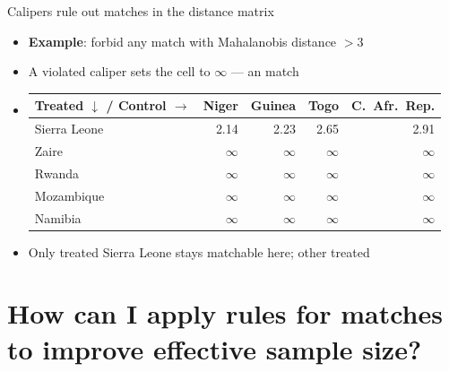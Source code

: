 \documentclass[table, xcolor = {dvipsnames}, 9pt]{beamer}
\theoremstyle{plain}
\newcommand{\mh}[1]{{\color{magenta}{#1}}}
\begin{document}
\begin{frame}{Calipers rule out matches in the distance matrix}
\vfill
\begin{itemize} \vfill
\item \textbf{Example}: forbid any match with Mahalanobis distance $> 3$ \vfill
\item A violated caliper sets the cell to $\infty$ --- an \mh{impossible} match \vfill
\item[] \vfill
\footnotesize
\begin{table}[H]
\centering
\begin{tabular}{lrrrr}
\toprule
Treated $\downarrow$ / Control $\rightarrow$ & Niger & Guinea & Togo & C.\ Afr.\ Rep. \\
\midrule
Sierra Leone & 2.14 & 2.23 & 2.65 & 2.91 \\
Zaire & $\infty$ & $\infty$ & $\infty$ & $\infty$ \\
Rwanda & $\infty$ & $\infty$ & $\infty$ & $\infty$ \\
Mozambique & $\infty$ & $\infty$ & $\infty$ & $\infty$ \\
Namibia & $\infty$ & $\infty$ & $\infty$ & $\infty$ \\
\bottomrule
\end{tabular}
\end{table}
\normalsize
\vfill
\item Only treated Sierra Leone stays matchable here; other treated \mh{ruled out} \vfill
\end{itemize} \vfill
\end{frame}
\section{How can I apply rules for matches to improve effective sample size?}
\end{document}
